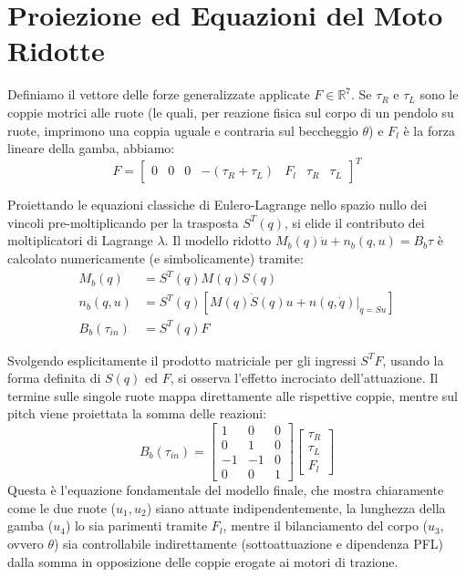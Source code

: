 \documentclass[11pt,a4paper]{article}
\begin{document}
\section{Proiezione ed Equazioni del Moto Ridotte}

Definiamo il vettore delle forze generalizzate applicate $F \in \mathbb{R}^7$. Se $\tau_R$ e $\tau_L$ sono le coppie motrici alle ruote (le quali, per reazione fisica sul corpo di un pendolo su ruote, imprimono una coppia uguale e contraria sul beccheggio $\theta$) e $F_l$ è la forza lineare della gamba, abbiamo:
\begin{equation}
    F = \begin{bmatrix} 0 & 0 & 0 & -(\tau_R + \tau_L) & F_l & \tau_R & \tau_L \end{bmatrix}^T
\end{equation}

Proiettando le equazioni classiche di Eulero-Lagrange nello spazio nullo dei vincoli pre-moltiplicando per la trasposta $S^T(q)$, si elide il contributo dei moltiplicatori di Lagrange $\lambda$. Il modello ridotto $M_b(q)\dot{u} + n_b(q,u) = B_b \tau$ è calcolato numericamente (e simbolicamente) tramite:
\begin{align}
    M_b(q) &= S^T(q) M(q) S(q) \\
    n_b(q,u) &= S^T(q) \left[ M(q) \dot{S}(q) u + n(q,\dot{q})\big|_{\dot{q} = S u} \right] \\
    B_b(\tau_{in}) &= S^T(q) F
\end{align}

Svolgendo esplicitamente il prodotto matriciale per gli ingressi $S^T F$, usando la forma definita di $S(q)$ ed $F$, si osserva l'effetto incrociato dell'attuazione. Il termine sulle singole ruote mappa direttamente alle rispettive coppie, mentre sul pitch viene proiettata la somma delle reazioni:
\begin{equation}
    B_b(\tau_{in}) = \begin{bmatrix}
    1 & 0 & 0 \\
    0 & 1 & 0 \\
    -1 & -1 & 0 \\
    0 & 0 & 1
    \end{bmatrix}
    \begin{bmatrix} \tau_R \\ \tau_L \\ F_l \end{bmatrix}
\end{equation}
Questa è l'equazione fondamentale del modello finale, che mostra chiaramente come le due ruote ($u_1, u_2$) siano attuate indipendentemente, la lunghezza della gamba ($u_4$) lo sia parimenti tramite $F_l$, mentre il bilanciamento del corpo ($u_3$, ovvero $\theta$) sia controllabile indirettamente (sottoattuazione e dipendenza PFL) dalla somma in opposizione delle coppie erogate ai motori di trazione.
\end{document}
